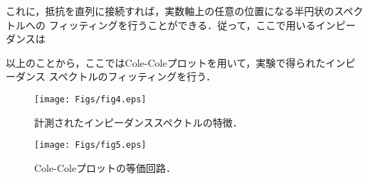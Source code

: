 \documentclass{jsce}
\begin{document}
これに，抵抗を直列に接続すれば，実数軸上の任意の位置になる半円状のスペクトルへの
フィッティングを行うことができる．従って，ここで用いるインピーダンスは

以上のことから，ここではCole-Coleプロットを用いて，実験で得られたインピーダンス
スペクトルのフィッティングを行う．

\begin{figure}[h]
	\begin{center}
	\texttt{[image: Figs/fig4.eps]} 
	\end{center}
	\caption{
		計測されたインピーダンススペクトルの特徴．
	} 
	\label{fig:fig4}
\end{figure}
\begin{figure}[h]
	\begin{center}
	\texttt{[image: Figs/fig5.eps]} 
	\end{center}
	\caption{
		Cole-Coleプロットの等価回路．
	} 
	\label{fig:fig5}
\end{figure}
\end{document}
